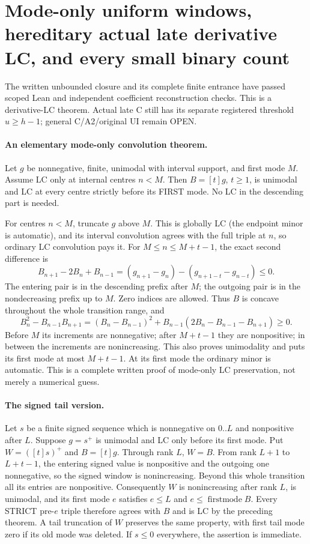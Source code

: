 \section{Mode-only uniform windows, hereditary actual late derivative LC, and every small binary count}
The written unbounded closure and its complete finite entrance have
passed scoped Lean and independent coefficient reconstruction checks.
This is a derivative-LC theorem. Actual late C still has its separate
registered threshold $u\ge h-1$; general C/A2/original UI remain OPEN.

\paragraph{An elementary mode-only convolution theorem.}
Let $g$ be nonnegative, finite, unimodal with interval support, and
first mode $M$. Assume LC only at internal centres $n<M$.
Then $B=[t]g$, $t\ge1$, is unimodal and LC at every centre strictly
before its FIRST mode. No LC in the descending part is needed.

For centres $n<M$, truncate $g$ above $M$. This is globally LC
(the endpoint minor is automatic), and its interval convolution
agrees with the full triple at $n$, so ordinary LC convolution pays it.
For $M\le n\le M+t-1$, the exact second difference is
\[
 B_{n+1}-2B_n+B_{n-1}
  =(g_{n+1}-g_n)-(g_{n+1-t}-g_{n-t})\le0.
\]
The entering pair is in the descending prefix after $M$; the outgoing
pair is in the nondecreasing prefix up to $M$. Zero indices are allowed.
Thus $B$ is concave throughout the whole transition range, and
\[
 B_n^2-B_{n-1}B_{n+1}
 =(B_n-B_{n-1})^2+B_{n-1}(2B_n-B_{n-1}-B_{n+1})\ge0.
\]
Before $M$ its increments are nonnegative; after $M+t-1$ they are
nonpositive; in between the increments are nonincreasing. This also
proves unimodality and puts its first mode at most $M+t-1$.
At its first mode the ordinary minor is automatic. This is a complete
written proof of mode-only LC preservation, not merely a numerical guess.

\paragraph{The signed tail version.}
Let $s$ be a finite signed sequence which is nonnegative on $0..L$
and nonpositive after $L$. Suppose $g=s^+$ is unimodal and LC only
before its first mode. Put $W=([t]s)^+$ and $B=[t]g$.
Through rank $L$, $W=B$. From rank $L+1$ to $L+t-1$, the entering
signed value is nonpositive and the outgoing one nonnegative, so
the signed window is nonincreasing. Beyond this whole transition
all its entries are nonpositive. Consequently $W$ is nonincreasing
after rank $L$, is unimodal, and its first mode $e$ satisfies
$e\le L$ and $e\le\operatorname{firstmode}B$.
Every STRICT pre-$e$ triple therefore agrees with $B$ and is LC
by the preceding theorem. A tail truncation of $W$ preserves the
same property, with first tail mode zero if its old mode was deleted.
If $s\le0$ everywhere, the assertion is immediate.

